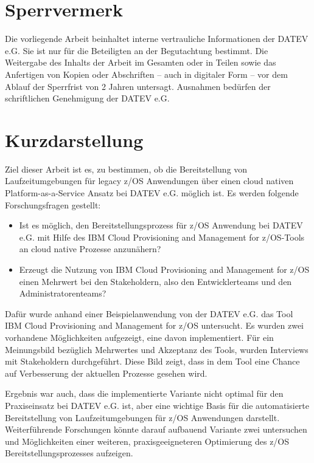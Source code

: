 \thispagestyle{empty}
\section*{Sperrvermerk}
Die vorliegende Arbeit beinhaltet interne vertrauliche Informationen der DATEV e.G.
Sie ist nur für die Beteiligten an der Begutachtung bestimmt.
Die Weitergabe des Inhalts der Arbeit im Gesamten oder in Teilen sowie das Anfertigen von Kopien oder Abschriften – auch in digitaler Form – vor dem Ablauf der Sperrfrist von 2 Jahren untersagt.
Ausnahmen bedürfen der schriftlichen Genehmigung der DATEV e.G.

\newpage
\section*{Kurzdarstellung}
\label{sec:kurzdarstellung}
Ziel dieser Arbeit ist es, zu bestimmen, ob die Bereitstellung von Laufzeitumgebungen für legacy z/OS Anwendungen über einen cloud nativen Platform-as-a-Service Ansatz bei DATEV e.G. möglich ist.
Es werden folgende Forschungsfragen gestellt:
\begin{itemize}
\item Ist es möglich, den Bereitstellungsprozess für z/OS Anwendung bei DATEV e.G. mit Hilfe des \glqq IBM Cloud Provisioning and Management for z/OS\grqq-Tools an cloud native Prozesse anzunähern?
\item Erzeugt die Nutzung von \glqq IBM Cloud Provisioning and Management for z/OS\grqq{} einen Mehrwert bei den Stakeholdern, also den Entwicklerteams und den Administratorenteams?
\end{itemize}

Dafür wurde anhand einer Beispielanwendung von der DATEV e.G. das Tool \glqq IBM Cloud Provisioning and Management for z/OS\grqq{} untersucht.
Es wurden zwei vorhandene Möglichkeiten aufgezeigt, eine davon implementiert.
Für ein Meinungsbild bezüglich  Mehrwertes und Akzeptanz des Tools, wurden Interviews mit Stakeholdern durchgeführt.
Diese Bild zeigt, dass in dem Tool eine Chance auf Verbesserung der aktuellen Prozesse gesehen wird.

Ergebnis war auch, dass die implementierte Variante nicht optimal für den Praxiseinsatz bei DATEV e.G. ist, aber eine wichtige Basis für die automatisierte Bereitstellung von Laufzeitumgebungen für z/OS Anwendungen darstellt.
Weiterführende Forschungen könnte darauf aufbauend Variante zwei untersuchen und  Möglichkeiten einer weiteren, praxisgeeigneteren Optimierung des z/OS Bereitstellungsprozesses aufzeigen.

